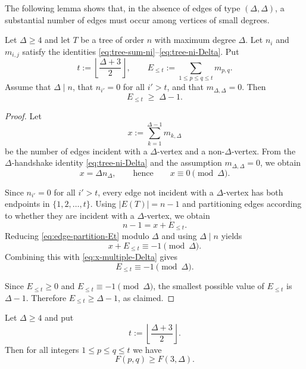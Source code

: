 \documentclass[preprint,12pt]{elsarticle}
\begin{document}
The following lemma shows that, in the absence of edges of type $(\Delta,\Delta)$,
a substantial number of edges must occur among vertices of small degrees.




\begin{lemma}
\label{lem:block-without-Delta}
Let $\Delta\ge 4$ and let $T$ be a tree of order $n$ with maximum degree $\Delta$.
Let $n_i$ and $m_{i,j}$ satisfy the identities
\eqref{eq:tree-sum-ni}--\eqref{eq:tree-ni-Delta}.
Put
\[
t:=\left\lfloor\frac{\Delta+3}{2}\right\rfloor,
\qquad
E_{\le t}:=\sum_{1\le p\le q\le t} m_{p,q}.
\]
Assume that $\Delta\mid n$,
that $n_{i'}=0$ for all $i'>t$,
and that $m_{\Delta,\Delta}=0$.
Then
\[
E_{\le t}\;\ge\;\Delta-1.
\]
\end{lemma}




\begin{proof}
Let
\[
x:=\sum_{k=1}^{\Delta-1} m_{k,\Delta}
\]
be the number of edges incident with a $\Delta$-vertex and a non-$\Delta$-vertex.
From the $\Delta$-handshake identity \eqref{eq:tree-ni-Delta} and the assumption $m_{\Delta,\Delta}=0$, we obtain
\begin{equation}
\label{eq:x-multiple-Delta}
x=\Delta n_\Delta,
\qquad\text{hence}\qquad
x\equiv 0 \pmod{\Delta}.
\end{equation}

Since $n_{i'}=0$ for all $i'>t$, every edge not incident with a $\Delta$-vertex has both endpoints in
$\{1,2,\dots,t\}$. Using $|E(T)|=n-1$ and partitioning edges according to whether they are incident with a
$\Delta$-vertex, we obtain
\begin{equation}
\label{eq:edge-partition-Et}
n-1 = x + E_{\le t}.
\end{equation}
Reducing \eqref{eq:edge-partition-Et} modulo $\Delta$ and using $\Delta\mid n$ yields
\[
x+E_{\le t}\equiv -1 \pmod{\Delta}.
\]
Combining this with \eqref{eq:x-multiple-Delta} gives
\begin{equation}
\label{eq:Et-cong}
E_{\le t}\equiv -1 \pmod{\Delta}.
\end{equation}

Since $E_{\le t}\ge 0$ and $E_{\le t}\equiv -1\pmod{\Delta}$, the smallest possible value of $E_{\le t}$
is $\Delta-1$. Therefore $E_{\le t}\ge \Delta-1$, as claimed.
\end{proof}





\begin{lemma}
\label{lem:Fpq-lower-by-F3D}
Let $\Delta\ge 4$ and put
\[
t:=\left\lfloor\frac{\Delta+3}{2}\right\rfloor .
\]
Then for all integers $1\le p\le q\le t$ we have
\begin{equation}
\label{eq:Fpq-lower-by-F3D}
F(p,q)\ge F(3,\Delta).
\end{equation}
\end{lemma}
\end{document}
